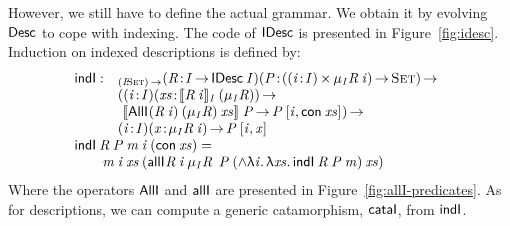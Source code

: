 \newcommand{\inductionI}{\F{indI}}
\newcommand{\cataI}{\F{cataI}}

However, we still have to define the actual grammar. We obtain it by
evolving $\Desc$ to cope with indexing.  The code of $\SYMBIDesc$ is presented in
Figure~\ref{fig:idesc}. Induction on indexed descriptions is defined
by:
%
\[\stk{
\begin{array}{@{}ll}
\inductionI : & _{\PI{\V{I}}{\Set}}
                   \PITEL{\V{R}}{\V{I} \To \IDesc{\V{I}}}
                   \PI{\V{P}}{(\SIGMA{\V{i}}{\V{I}}{\IMu{\V{I}}{\V{R}}{\V{i}}}) \To \Set} \\
                 & (      \PITEL{\V{i}}{\V{I}} 
                          \PI{\V{xs}}{\idescop{\V{R}\: \V{i}}{\V{I}}{(\SYMBIMu_{\V{I}}{\V{R}})}} \\
                 & \   \idescop{\AllI{}
                                     {(\V{R}\: \V{i})}
                                     {(\SYMBIMu_{\V{I}}{\V{R}})}
                                     {\V{xs}}}
                               {}
                               {\V{P}} \To
                       \V{P}\: \pair{\V{i}}{\Con{\V{xs}}}{}) \To \\
                 & \PITEL{\V{i}}{\V{I}}
                   \PI{\V{x}}{\IMu{\V{I}}{\V{R}}{\V{i}}}
                   \V{P}\: \pair{\V{i}}{\V{x}}{}
\end{array} \\
\inductionI\: \V{R}\: \V{P}\: \V{m}\: \V{i}\: (\Con{\V{xs}}) =  \\
\qquad
    \V{m}\: \V{i}\: \V{xs}\: (\allI{}
                                    {\V{R}\: \V{i}}
                                    {\IMu{\V{I}}{\V{R}}{}}
                                    {\V{P}}
                                    {(\spl{\LAM{\V{i}}\LAM{\V{xs}} \inductionI\: \V{R}\: \V{P}\: \V{m}})}
                                    {\V{xs}})
}\]
%
Where the operators $\SYMBAllI$ and $\SYMBallI$ are
presented in Figure~\ref{fig:allI-predicates}. As for descriptions, we
can compute a generic catamorphism, $\cataI$, from $\inductionI$.


